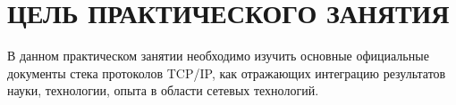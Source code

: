 \section{ЦЕЛЬ ПРАКТИЧЕСКОГО ЗАНЯТИЯ}

В данном практическом занятии необходимо изучить основные официальные документы
стека протоколов TCP/IP, как отражающих интеграцию результатов науки,
технологии, опыта в области сетевых технологий.

\newpage
